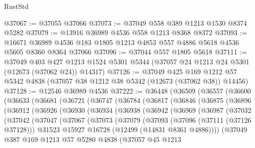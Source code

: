 \begin{lexlean}{RustStd}
\begin{coremodule}
{\begin{coremodule}
{{{{{{{{{{{{{{{{{{{{{{{{{{{{{{{{{{{{{{{{{{{{{{{{{{{{{{{{{{{{{{{{{{{{{{{{{{{{{{{{@37067 := @37055 @37066
@37073 := @37049 @558 @389 @1213 @1530 @8374 @5282
@37079 := @13916 @36989 @4536 @558 @1213 @8368 @8372
@37093 := @16671 @36989 @4536 @183 @1805 @1213 @4853 @557 @4886 @5618 @4536 @5605 @8360 @8364 @37066
@37096 := @37044 @557 @1805 @5618
@37111 := @37049
    @403
    @427
    @1213
    @1524
    @5301
    @5344
    (@37057 @24 @1213 @24 @5301 (@12673 (@37062 @24)) @14317)
@37126 := @37049
    @425
    @169
    @1212
    @57
    @5342
    @4838
    (@37057 @38 @1212 @38 @5342 (@12673 (@37062 @38)) @14456)
@37128 := @12546 @36989 @4536
@37222 := @36448
    (@36509
      (@36557
        (@36600
          (@36633
            (@36681
              (@36721
                (@36747
                  (@36784
                    (@36817
                      (@36846
                        (@36875
                          (@36896
                            (@36912
                              (@36926
                                (@36930
                                  (@36934
                                    (@36938
                                      (@36942
                                        (@36969
                                          (@36987
                                            (@37032
                                              (@37042
                                                (@37047
                                                  (@37067
                                                    (@37073
                                                      (@37079
                                                        (@37093
                                                          (@37096 (@37111 (@37126 @37128)))
                                                          @31523
                                                          @15927
                                                          @16728
                                                          (@12499 (@14831 @8361 @4886))))
                                                      (@37049
                                                        @387
                                                        @169
                                                        @1213
                                                        @57
                                                        @5280
                                                        @4838
                                                        (@37057
                                                          @45
                                                          @1213
}}}}}}}}}}}}}}}}}}}}}}}}}}}}}}}}}}}}}}}}}}}}}}}}}}}}}}}}}}}}}}}}}}}}}}}}}}}}}}}}
\end{coremodule}}
\end{coremodule}
\end{lexlean}
